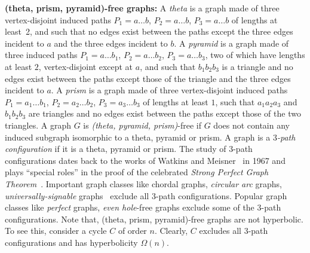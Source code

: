 \documentclass[a4paper]{article}
\begin{document}
 \smallskip
\noindent
\textbf{(theta, prism, pyramid)-free graphs:} A \emph{theta} is a graph made of three vertex-disjoint induced paths $P_1 = a\ldots b$, $P_2 = a\ldots b$, $P_3 = a\ldots b$ of lengths at least~2, and such that no edges exist between the paths except the three edges incident to $a$ and the three edges incident to $b$. 
A \emph{pyramid} is a graph made of three induced paths $P_1 = a\ldots b_1$, $P_2 = a\ldots b_2$, $P_3 = a\ldots b_3$, two of which have lengths at least $2$, vertex-disjoint except at $a$, and such that $b_1 b_2 b_3$ is a triangle and no edges exist between the paths except those of the triangle and the three edges incident to $a$. A \emph{prism} is a graph made of three vertex-disjoint induced paths $P_1 = a_1\ldots b_1$, $P_2 = a_2\ldots b_2$, $P_3 = a_3\ldots b_3$ of lengths at least $1$, such that $a_1 a_2 a_3$ and $b_1 b_2b_3$ are triangles and no edges exist between the paths except those of the two triangles. A graph $G$ is \emph{(theta, pyramid, prism)}-free if $G$ does not contain any induced subgraph isomorphic to a theta, pyramid or prism. A graph is a \emph{$3$-path configuration} if it is a theta, pyramid or prism. The study of $3$-path configurations dates back to the works of Watkins and Meisner~\cite{watkins1967cycles} in 1967 and plays ``special roles'' in the proof of the celebrated \emph{Strong Perfect Graph Theorem}~\cite{chudnovsky2006strong,diot2020theta,trotignon2013perfect,vuskovic2013world}. Important graph classes like chordal graphs, \emph{circular arc} graphs, \emph{universally-signable} graphs~\cite{conforti1997universally} exclude all $3$-path configurations. Popular graph classes like \emph{perfect} graphs, \emph{even hole}-free graphs exclude some of the $3$-path configurations. Note that, (theta, prism, pyramid)-free graphs are not hyperbolic. To see this, consider a cycle $C$ of order $n$. Clearly, $C$ excludes all $3$-path configurations and has hyperbolicity $\Omega(n)$.
\end{document}
